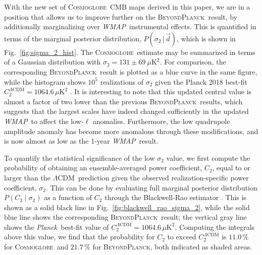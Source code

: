 \documentclass[twocolumn]{../../common/aa}
\def\WMAP{\emph{WMAP}}
\def\Planck{\emph{Planck}}
\def\LCDM{$\Lambda$CDM}
\newcommand{\bp}{\textsc{BeyondPlanck}}
\newcommand{\cosmoglobe}{\textsc{Cosmoglobe}}
\newcommand{\Cosmoglobe}{\textsc{Cosmoglobe}}
\newcommand{\data}{\vec d}
\begin{document}
With the new set of \cosmoglobe\ CMB maps derived in this paper, we are in a position that allows us to improve further on the \bp\ result, by additionally marginalizing over \WMAP\ instrumental effects. This is quantified in terms of the marginal posterior distribution, $P(\sigma_2\,|\,\data)$, which is shown in Fig.~\ref{fig:sigma_2_hist}. The \cosmoglobe\ estimate may be summarized in terms of a Gaussian distribution with $\sigma_2 = 131 \pm 69\ \mu\mathrm{K}^2$. For comparison, the corresponding \bp\ result is plotted as a blue curve in the same figure, while the histogram shows $10^5$ realizations of $\sigma_2$ given the Planck 2018 best-fit $C^{\Lambda \mathrm{CDM}}_2 = 1064.6\, \mu\mathrm{K}^2$ \citep{planck2016-l06}. It is interesting to note that this updated central value is almost a factor of two lower than the previous \bp\ results, which suggests that the largest scales have indeed changed sufficiently in the updated \WMAP\ to affect the low-$\ell$ anomalies. Furthermore, the low quadrupole amplitude anomaly has become more anomalous through these modifications, and is now almost as low as the 1-year \WMAP\ result.




To quantify the statistical significance of the low $\sigma_2$ value, we first compute the probability of obtaining an ensemble-averaged power coefficient, $C_2$, equal to or larger than the \LCDM\ prediction given the observed realization-specific power coefficient, $\sigma_2$. This can be done by evaluating full marginal posterior distribution $P(C_2 \mid\sigma_2)$ as a function of $C_2$ through the Blackwell-Rao estimator \citep{chu2005}. This is shown as a solid black line in Fig.~\ref{fig:blackwell_rao_sigma_2}, while the solid blue line shows the corresponding \bp\ result; the vertical gray line shows the \Planck\ best-fit value of $C^{\Lambda \mathrm{CDM}}_2 = 1064.6\, \mu\mathrm{K}^2$. Computing the integrals above this value, we find that the probability for $C_2$ to exceed $C^{\Lambda \mathrm{CDM}}_2$ is $11.0\,\%$ for \cosmoglobe\ and $21.7\,\%$ for \bp, both indicated as shaded areas.
\end{document}
